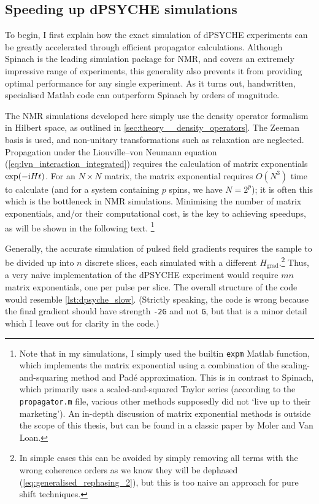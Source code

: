 \subsection{Speeding up dPSYCHE simulations}
\label{subsec:pureshift__dpsyche_simulations}

To begin, I first explain how the exact simulation of dPSYCHE experiments can be greatly accelerated through efficient propagator calculations.
Although Spinach\autocite{Hogben2011JMR} is the leading simulation package for NMR, and covers an extremely impressive range of experiments, this generality also prevents it from providing optimal performance for any single experiment.
As it turns out, handwritten, specialised Matlab code can outperform Spinach by orders of magnitude.

The NMR simulations developed here simply use the density operator formalism in Hilbert space, as outlined in \cref{sec:theory__density_operators}.
The Zeeman basis is used, and non-unitary transformations such as relaxation are neglected.
Propagation under the Liouville--von Neumann equation (\cref{eq:lvn_interaction_integrated}) requires the calculation of matrix exponentials $\exp(-\mathrm{i} H t)$.
For an $N \times N$ matrix, the matrix exponential requires $O(N^3)$ time to calculate (and for a system containing $p$ spins, we have $N = 2^p$); it is often this which is the bottleneck in NMR simulations.
Minimising the number of matrix exponentials, and/or their computational cost, is the key to achieving speedups, as will be shown in the following text.%
\footnote{Note that in my simulations, I simply used the builtin \texttt{expm} Matlab function, which implements the matrix exponential using a combination of the scaling-and-squaring method and Pad\'e approximation\autocite{Higham2005SIAMJMAA}.
This is in contrast to Spinach, which primarily uses a scaled-and-squared Taylor series (according to the \texttt{propagator.m} file, various other methods supposedly did not `live up to their marketing').
An in-depth discussion of matrix exponential methods is outside the scope of this thesis, but can be found in a classic paper by Moler and Van Loan\autocite{Moler2003SIAMR}.}

Generally, the accurate simulation of pulsed field gradients requires the sample to be divided up into $n$ discrete slices, each simulated with a different $H_\text{grad}$.\footnote{In simple cases this can be avoided by simply removing all terms with the wrong coherence orders as we know they will be dephased (\cref{eq:generalised_rephasing_2}), but this is too naive an approach for pure shift techniques.}
Thus, a very naive implementation of the dPSYCHE experiment would require $mn$ matrix exponentials, one per pulse per slice.
The overall structure of the code would resemble \cref{lst:dpsyche_slow}.
(Strictly speaking, the code is wrong because the final gradient should have strength \texttt{-2G} and not \texttt{G}, but that is a minor detail which I leave out for clarity in the code.)

